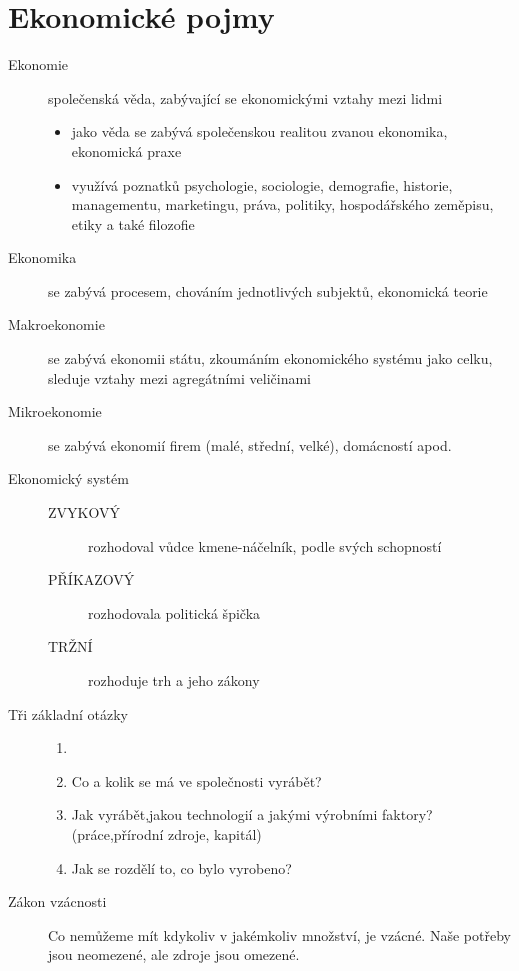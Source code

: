 \chapter{Ekonomické pojmy}

\begin{description}
    \item[Ekonomie] společenská věda, zabývající se ekonomickými vztahy mezi lidmi
    \begin{itemize}
        \item jako věda se zabývá společenskou realitou zvanou ekonomika, ekonomická praxe
        \item využívá poznatků psychologie, sociologie, demografie, historie, managementu, marketingu, práva, politiky, hospodářského zeměpisu, etiky a také filozofie
    \end{itemize}
    \item[Ekonomika] se zabývá procesem, chováním jednotlivých subjektů, ekonomická teorie
    \item[Makroekonomie] se zabývá ekonomii státu, zkoumáním ekonomického systému jako celku, sleduje vztahy mezi agregátními veličinami
    \item[Mikroekonomie] se zabývá ekonomií firem (malé, střední, velké), domácností apod.
    \item[Ekonomický systém]
    \begin{description}
        \item[]
        \item[ZVYKOVÝ] rozhodoval vůdce kmene-náčelník, podle svých schopností
        \item[PŘÍKAZOVÝ] rozhodovala politická špička
        \item[TRŽNÍ] rozhoduje trh a jeho zákony
    \end{description}
    \item[Tři základní otázky]
    \begin{enumerate}
        \item[]
        \item Co a kolik se má ve společnosti vyrábět?
        \item Jak vyrábět,jakou technologií a jakými výrobními faktory?(práce,přírodní zdroje, kapitál)
        \item Jak se rozdělí to, co bylo vyrobeno?
    \end{enumerate}
    \item[Zákon vzácnosti] Co nemůžeme mít kdykoliv v jakémkoliv množství, je vzácné. Naše potřeby jsou neomezené, ale zdroje jsou omezené.

\end{description}
